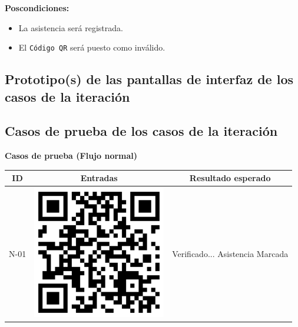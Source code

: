 \documentclass{article}
\newcommand{\newsubsection}[1]{
  \indent \textbf{#1}\\
}
\begin{document}
\newsubsection{Poscondiciones:}
\begin{itemize}
\item La asistencia será registrada.
\item El \texttt{Código QR} será puesto como inválido.
\end{itemize}

\subsection{Prototipo(s) de las pantallas de interfaz de los casos de la iteración}

\subsection{Casos de prueba de los casos de la iteración}
\newsubsection{Casos de prueba (Flujo normal)}
\begin{center}
  \begin{tabular}{| c | c | c |}
    \hline
    ID & Entradas & Resultado esperado \\\hline
    N-01 &   \includegraphics[scale=.2]{../imagenes/qr.png} & Verificado...
    Asistencia Marcada \\\hline
  \end{tabular}
\end{center}
\end{document}
